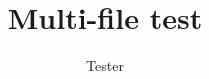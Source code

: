 \documentclass{article}
\begin{document}
\title{Multi-file test}\author{Tester}\maketitle
\tableofcontents




\end{document}
